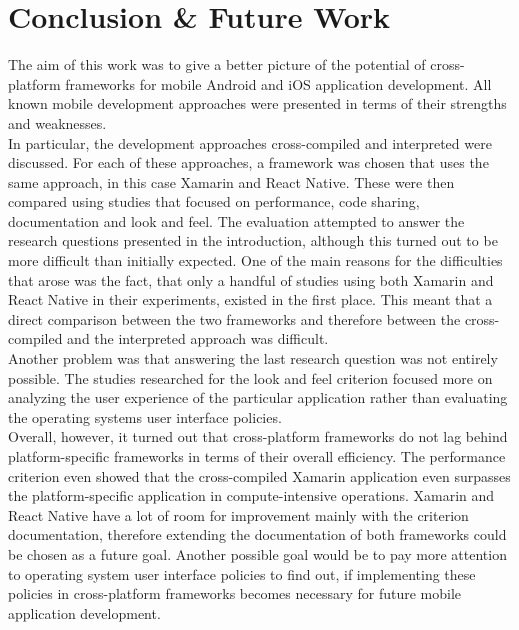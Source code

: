 \documentclass[Bachelor,BIF,english]{twbook}
\newcommand{\FHTWCitationType}{IEEE} %
\begin{document}
\chapter{Conclusion \& Future Work}
The aim of this work was to give a better picture of the potential of cross-platform frameworks for mobile Android and iOS application development. All known mobile development approaches were presented in terms of their strengths and weaknesses.
\\[\baselineskip]
In particular, the development approaches cross-compiled and interpreted were discussed. For each of these approaches, a framework was chosen that uses the same approach, in this case Xamarin and React Native. These were then compared using studies that focused on performance, code sharing, documentation and look and feel. The evaluation attempted to answer the research questions presented in the introduction, although this turned out to be more difficult than initially expected. One of the main reasons for the difficulties that arose was the fact, that only a handful of studies using both Xamarin and React Native in their experiments, existed in the first place. This meant that a direct comparison between the two frameworks and therefore between the cross-compiled and the interpreted approach was difficult.
\\[\baselineskip]
Another problem was that answering the last research question was not entirely possible. The studies researched for the look and feel criterion focused more on analyzing the user experience of the particular application rather than evaluating the operating systems user interface policies.
\\[\baselineskip]
Overall, however, it turned out that cross-platform frameworks do not lag behind platform-specific frameworks in terms of their overall efficiency. The performance criterion even showed that the cross-compiled Xamarin application even surpasses the platform-specific application in compute-intensive operations. Xamarin and React Native have a lot of room for improvement mainly with the criterion documentation, therefore extending the documentation of both frameworks could be chosen as a future goal. Another possible goal would be to pay more attention to operating system user interface policies to find out, if implementing these policies in cross-platform frameworks becomes necessary for future mobile application development.




\clearpage
\ifthenelse{\equal{\FHTWCitationType}{HARVARD}}{}{}

\clearpage
\end{document}
